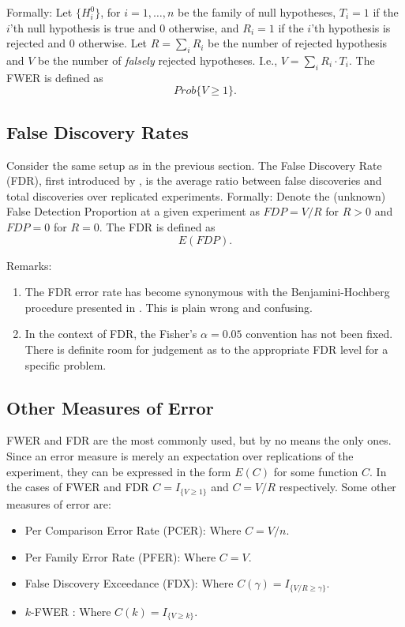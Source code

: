 \documentclass[draft,12pt]{article}
\begin{document}
Formally: Let $ \{ H^0_i \} $, for $i=1,\ldots,n$ be the family of null hypotheses, $T_i=1$ if the $i$'th null hypothesis is true and 0 otherwise,  and $R_i=1$ if the $i$'th hypothesis is rejected and 0 otherwise.
Let $R=\sum_i{R_i}$ be the number of rejected hypothesis and $V$ be the number of \emph{falsely} rejected hypotheses. I.e., $V=\sum_i{R_i \cdot T_i}$.
The FWER is defined as $$Prob\{V \geq1  \}.$$

\subsection{\label{sub:fdr}False Discovery Rates}
Consider the same setup as in the previous section. The False Discovery Rate (FDR), first introduced by \citet{benjamini_controlling_1995}, is the average ratio between false discoveries and total discoveries over replicated experiments.
Formally:  Denote the (unknown) False Detection Proportion at a given experiment as $FDP=V/R$ for $R>0$ and $FDP=0$ for $R=0$.  
The FDR is defined as $$E \left( FDP \right).$$

Remarks:
\begin{enumerate}
\item The FDR error rate has become synonymous with the Benjamini-Hochberg procedure presented in \citep{benjamini_controlling_1995} . This is plain wrong and confusing. 
\item In the context of FDR, the Fisher's $\alpha=0.05$ convention has not been fixed. There is definite room for judgement as to the appropriate FDR level for a specific problem.
\end{enumerate}




\subsection{Other Measures of Error}
FWER and FDR are the most commonly used, but by no means the only ones. Since an error measure is merely an expectation over replications of the experiment, they can be expressed in the form $E(C)$ for some function $C$. In the cases of FWER and FDR $C = I_{\{ V \geq 1 \} } $ and $C = V/R$ respectively.
Some other measures of error are:

\begin{itemize}
\item Per Comparison Error Rate (PCER): Where $C=V/n$.
\item Per Family Error Rate (PFER): Where $C=V$.
\item False Discovery Exceedance (FDX)\citep{genovese_exceedance_2006}: Where $C(\gamma) = I_{\{ V/R \geq \gamma \} }$.
\item $k$-FWER \citep{van_der_laan_augmentation_2004}: Where $C(k) = I_{\{ V \geq k \} }$.
\end{itemize}
\end{document}
